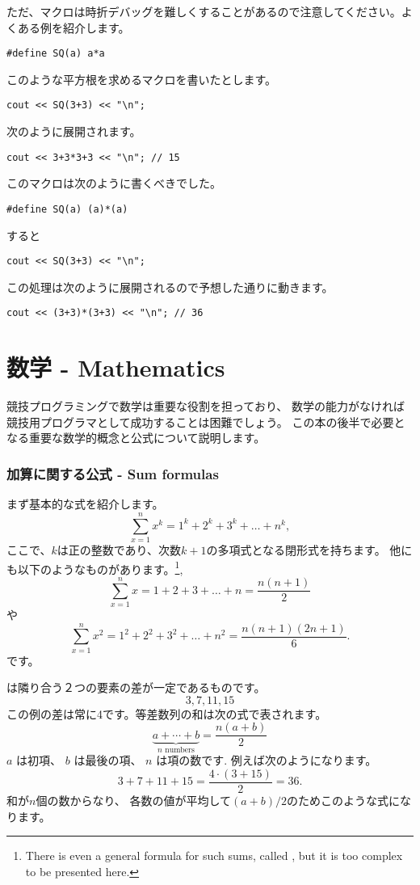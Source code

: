 ただ、マクロは時折デバッグを難しくすることがあるので注意してください。よくある例を紹介します。
\begin{lstlisting}
#define SQ(a) a*a
\end{lstlisting}
このような平方根を求めるマクロを書いたとします。
\begin{lstlisting}
cout << SQ(3+3) << "\n";
\end{lstlisting}
次のように展開されます。
\begin{lstlisting}
cout << 3+3*3+3 << "\n"; // 15
\end{lstlisting}

このマクロは次のように書くべきでした。
\begin{lstlisting}
#define SQ(a) (a)*(a)
\end{lstlisting}
すると
\begin{lstlisting}
cout << SQ(3+3) << "\n";
\end{lstlisting}
この処理は次のように展開されるので予想した通りに動きます。
\begin{lstlisting}
cout << (3+3)*(3+3) << "\n"; // 36
\end{lstlisting}


\section{数学 - Mathematics}

競技プログラミングで数学は重要な役割を担っており、
数学の能力がなければ競技用プログラマとして成功することは困難でしょう。
この本の後半で必要となる重要な数学的概念と公式について説明します。

\subsubsection{加算に関する公式 - Sum formulas}

まず基本的な式を紹介します。
\[\sum_{x=1}^n x^k = 1^k+2^k+3^k+\ldots+n^k,\]
ここで、$k$は正の整数であり、次数$k + 1$の多項式となる閉形式を持ちます。
他にも以下のようなものがあります。\footnote{
There is even a general formula for such sums, called ,
but it is too complex to be presented here.},
\[\sum_{x=1}^n x = 1+2+3+\ldots+n = \frac{n(n+1)}{2}\]
や
\[\sum_{x=1}^n x^2 = 1^2+2^2+3^2+\ldots+n^2 = \frac{n(n+1)(2n+1)}{6}.\]
です。


は隣り合う２つの要素の差が一定であるものです。
\[3, 7, 11, 15\]
この例の差は常に4です。等差数列の和は次の式で表されます。
\[\underbrace{a + \cdots + b}_{n \,\, \textrm{numbers}} = \frac{n(a+b)}{2}\]
$a$ は初項、
$b$ は最後の項、
$n$ は項の数です.
例えば次のようになります。
\[3+7+11+15=\frac{4 \cdot (3+15)}{2} = 36.\]
和が$n$個の数からなり、
各数の値が平均して$(a+b)/2$のためこのような式になります。

